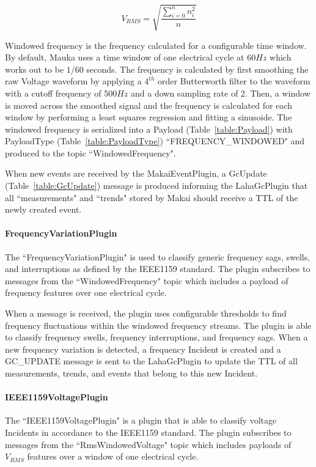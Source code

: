 \begin{equation}
\label{equation:Vrms}
	V_{RMS} = \sqrt{\frac{\sum_{i=0}^{n} n_{i}^2}{n}}
\end{equation}

Windowed frequency is the frequency calculated for a configurable time window. By default, Mauka uses a time window of one electrical cycle at 60$Hz$ which works out to be $1/60$ seconds. The frequency is calculated by first smoothing the raw Voltage waveform by applying a $4^{th}$ order Butterworth filter to the waveform with a cutoff frequency of 500$Hz$ and a down sampling rate of 2. Then, a window is moved across the smoothed signal and the frequency is calculated for each window by performing a least squares regression and fitting a sinusoide. The windowed frequency is serialized into a Payload (Table~\ref{table:Payload}) with PayloadType (Table~\ref{table:PayloadType}) ``FREQUENCY\_WINDOWED" and produced to the topic ``WindowedFrequency".

When new events are received by the MakaiEventPlugin, a GcUpdate (Table~\ref{table:GcUpdate}) message is produced informing the LahaGcPlugin that all ``measurements" and ``trends" stored by Makai should receive a TTL of the newly created event.

\paragraph{FrequencyVariationPlugin}
The ``FrequencyVariationPlugin" is used to classify generic frequency sags, swells, and interruptions as defined by the IEEE1159 standard\cite{IEEE:2018:1159D3}. The plugin subscribes to messages from the ``WindowedFrequency" topic which includes a payload of frequency features over one electrical cycle.

When a message is received, the plugin uses configurable thresholds to find frequency fluctuations within the windowed frequency streams. The plugin is able to classify frequency swells, frequency interruptions, and frequency sags. When a new frequency variation is detected, a frequency Incident is created and a GC\_UPDATE message is sent to the LahaGcPlugin to update the TTL of all measurements, trends, and events that belong to this new Incident.

\paragraph{IEEE1159VoltagePlugin}
The ``IEEE1159VoltagePlugin" is a plugin that is able to classify voltage Incidents in accordance to the IEEE1159 standard\cite{IEEE:2018:1159D3}. The plugin subscribes to messages from the ``RmsWindowedVoltage" topic which includes payloads of $V_{RMS}$ features over a window of one electrical cycle.


